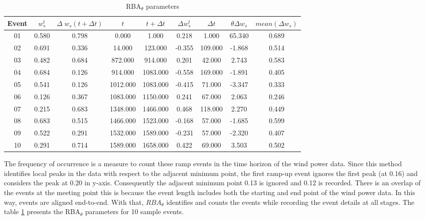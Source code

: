 \begin{table}[!htbp]
\centering
\begin{tabular}{ccccccccc} \hline
Event & $w_s^t$ & $\Delta \; w_s (t+\Delta t)$ & $t$ & $t+\Delta t$ & $\Delta w_s^t$ & $\Delta t$ & $\theta \Delta w_s$ & $mean(\Delta w_s)$ \\ \hline
01 &	0.580	&	0.798	&	0.000	&	1.000	&	0.218	&	1.000	&	65.340	&	0.689	\\
02 &	0.691	&	0.336	&	14.000	&	123.000	&	-0.355	&	109.000	&	-1.868	&	0.514	\\
03 	&	0.482	&	0.684	&	872.000	&	914.000	&	0.201	&	42.000	&	2.743	&	0.583	\\
04 &	0.684	&	0.126	&	914.000	&	1083.000	&	-0.558	&	169.000	&	-1.891	&	0.405	\\
05 &	0.541	&	0.126	&	1012.000	&	1083.000	&	-0.415	&	71.000	&	-3.347	&	0.333	\\
06 &	0.126	&	0.367	&	1083.000	&	1150.000	&	0.241	&	67.000	&	2.063	&	0.246	\\
07 	&	0.215	&	0.683	&	1348.000	&	1466.000	&	0.468	&	118.000	&	2.270	&	0.449	\\
08 &	0.683	&	0.515	&	1466.000	&	1523.000	&	-0.168	&	57.000	&	-1.685	&	0.599	\\
09 &	0.522	&	0.291	&	1532.000	&	1589.000	&	-0.231	&	57.000	&	-2.320	&	0.407	\\
10	&	0.291	&	0.714	&	1589.000	&	1658.000	&	0.422	&	69.000	&	3.503	&	0.502	\\
\hline
\end{tabular}
\caption{RBA$_\theta$ parameters}
\label{tbl:rba1}
\end{table}

The frequency of occurrence is a measure to count these ramp events in the time horizon of the wind power data. Since this method identifies local peaks in the data with respect to the adjacent minimum point, the first ramp-up event ignores the first peak (at 0.16) and considers the peak at 0.20 in y-axis. Consequently the adjacent minimum point 0.13 is ignored and 0.12 is recorded. There is an overlap of the events at the meeting point this is because the event length includes both the starting and end point of the wind power data. In this way, events are aligned end-to-end. With that, $RBA_\theta$ identifies and counts the events while recording the event details at all stages. The table \ref{tbl:rba1} presents the RBA$_\theta$ parameters for 10 sample events.  